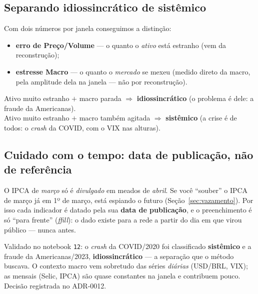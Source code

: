 \subsection{Separando idiossincrático de sistêmico}
\label{sec:cond-regime}

Com dois números por janela conseguimos a distinção:
\begin{itemize}[noitemsep]
  \item \textbf{erro de Preço/Volume} --- o quanto o \emph{ativo} está estranho (vem da
        reconstrução);
  \item \textbf{estresse Macro} --- o quanto o \emph{mercado} se mexeu (medido direto da macro, pela
        amplitude dela na janela --- não por reconstrução).
\end{itemize}

\begin{exemplo}
Ativo muito estranho $+$ macro parada $\Rightarrow$ \textbf{idiossincrático} (o problema é dele:
a fraude da Americanas). \\
Ativo muito estranho $+$ macro também agitada $\Rightarrow$ \textbf{sistêmico} (a crise é de todos:
o \emph{crash} da COVID, com o VIX nas alturas).
\end{exemplo}

\subsection{Cuidado com o tempo: data de publicação, não de referência}
\label{sec:cond-leak}

\begin{intuicao}
O IPCA de \emph{março} só é \emph{divulgado} em meados de \emph{abril}. Se você ``souber'' o IPCA de
março já em 1º de março, está espiando o futuro (Seção~\ref{sec:vazamento}). Por isso cada indicador
é datado pela sua \textbf{data de publicação}, e o preenchimento é só ``para frente'' (\emph{ffill}):
o dado existe para a rede a partir do dia em que virou público --- nunca antes.
\end{intuicao}

\begin{naprat}
Validado no notebook \texttt{12}: o \emph{crash} da COVID/2020 foi classificado \textbf{sistêmico}
e a fraude da Americanas/2023, \textbf{idiossincrático} --- a separação que o método buscava. O
contexto macro vem sobretudo das séries \emph{diárias} (USD/BRL, VIX); as mensais (Selic, IPCA) são
quase constantes na janela e contribuem pouco. Decisão registrada no ADR-0012.
\end{naprat}
